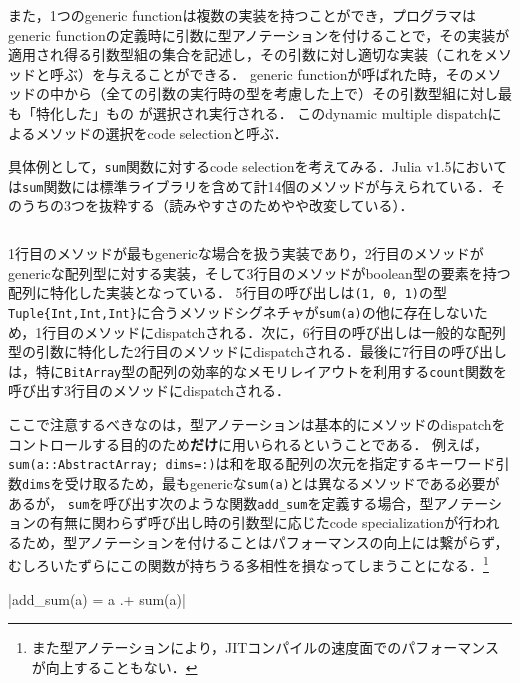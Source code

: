 また，1つのgeneric functionは複数の実装を持つことができ，プログラマはgeneric functionの定義時に引数に型アノテーションを付けることで，その実装が適用され得る引数型組の集合を記述し，その引数に対し適切な実装（これをメソッドと呼ぶ）を与えることができる．
generic functionが呼ばれた時，そのメソッドの中から（全ての引数の実行時の型を考慮した上で）その引数型組に対し最も「特化した」もの\footnotemark
が選択され実行される．
このdynamic multiple dispatchによるメソッドの選択をcode selectionと呼ぶ．


具体例として，\verb|sum|関数に対するcode selectionを考えてみる．Julia v1.5においては\verb|sum|関数には標準ライブラリを含めて計14個のメソッドが与えられている．そのうちの3つを抜粋する（読みやすさのためやや改変している）．

\inputminted[frame=lines, linenos]{julia}{src/sums_method.jl}

1行目のメソッドが最もgenericな場合を扱う実装であり，2行目のメソッドがgenericな配列型に対する実装，そして3行目のメソッドがboolean型の要素を持つ配列に特化した実装となっている．
5行目の呼び出しは\verb|(1, 0, 1)|の型\verb|Tuple{Int,Int,Int}|に合うメソッドシグネチャが\verb|sum(a)|の他に存在しないため，1行目のメソッドにdispatchされる．次に，6行目の呼び出しは一般的な配列型の引数に特化した2行目のメソッドにdispatchされる．最後に7行目の呼び出しは，特に\verb|BitArray|型の配列の効率的なメモリレイアウトを利用する\verb|count|関数を呼び出す3行目のメソッドにdispatchされる．

ここで注意するべきなのは，型アノテーションは基本的にメソッドのdispatchをコントロールする目的のため\textbf{だけ}に用いられるということである．
例えば，\verb|sum(a::AbstractArray; dims=:)|は和を取る配列の次元を指定するキーワード引数\verb|dims|を受け取るため，最もgenericな\verb|sum(a)|とは異なるメソッドである必要があるが，
\verb|sum|を呼び出す次のような関数\verb|add_sum|を定義する場合，型アノテーションの有無に関わらず呼び出し時の引数型に応じたcode specializationが行われるため，型アノテーションを付けることはパフォーマンスの向上には繋がらず，むしろいたずらにこの関数が持ちうる多相性を損なってしまうことになる．\footnote{
  また型アノテーションにより，JITコンパイルの速度面でのパフォーマンスが向上することもない．
}

|add_sum(a) = a .+ sum(a)|

